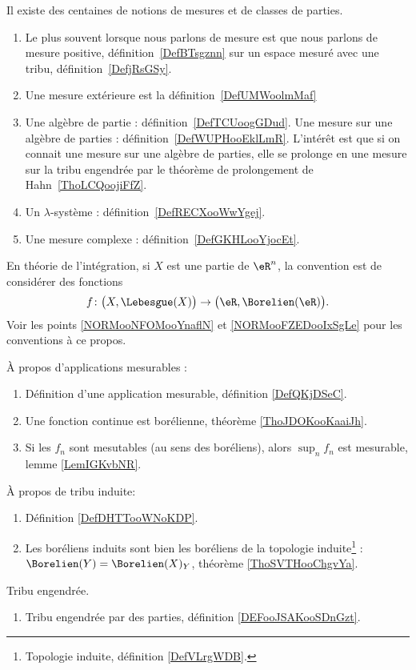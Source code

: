   \label{INTooVDSCooHXLLKp}
Il existe des centaines de notions de mesures et de classes de parties.
\begin{enumerate}
	\item
	      Le plus souvent lorsque nous parlons de mesure est que nous parlons de mesure positive, définition~\ref{DefBTsgznn} sur un espace mesuré avec une tribu, définition~\ref{DefjRsGSy}.
	\item
	      Une mesure extérieure est la définition~\ref{DefUMWoolmMaf}
	\item
	      Une algèbre de partie : définition~\ref{DefTCUoogGDud}. Une mesure sur une algèbre de parties : définition~\ref{DefWUPHooEklLmR}. L'intérêt est que si on connait une mesure sur une algèbre de parties, elle se prolonge en une mesure sur la tribu engendrée par le théorème de prolongement de Hahn~\ref{ThoLCQoojiFfZ}.
	\item
	      Un \( \lambda\)-système : définition~\ref{DefRECXooWwYgej}.
	\item
	      Une mesure complexe : définition~\ref{DefGKHLooYjocEt}.
\end{enumerate}

En théorie de l'intégration, si \( X\) est une partie de \( \eR^n\), la convention est de considérer des fonctions
\begin{equation*}
	f\colon \big( X,\Lebesgue(X) \big)\to \big( \eR,\Borelien(\eR) \big).
\end{equation*}
Voir les points \ref{NORMooNFOMooYnaflN} et \ref{NORMooFZEDooIxSgLe} pour les conventions à ce propos.

À propos d'applications mesurables :
\begin{enumerate}
	\item
	      Définition d'une application mesurable, définition \ref{DefQKjDSeC}.
	\item
	      Une fonction continue est borélienne, théorème \ref{ThoJDOKooKaaiJh}.
	\item
	      Si les \( f_n\) sont mesutables (au sens des boréliens), alors \( \sup_nf_n\) est mesurable, lemme \ref{LemIGKvbNR}.
\end{enumerate}


À propos de tribu induite:
\begin{enumerate}
	\item
	      Définition \ref{DefDHTTooWNoKDP}.
	\item
	      Les boréliens induits sont bien les boréliens de la topologie induite\footnote{Topologie induite, définition \ref{DefVLrgWDB}.} : \( \Borelien(Y)=\Borelien(X)_Y\), théorème \ref{ThoSVTHooChgvYa}.
\end{enumerate}

Tribu engendrée.
\begin{enumerate}
	\item
	      Tribu engendrée par des parties, définition \ref{DEFooJSAKooSDnGzt}.
\end{enumerate}
